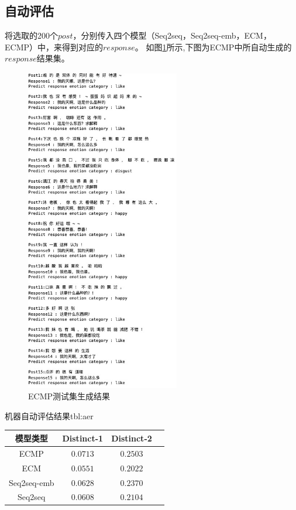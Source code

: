 \documentclass[supercite]{HustGraduPaper}
\theoremstyle{definition}
\begin{document}
\subsection{自动评估}
将选取的200个$post$，分别传入四个模型（Seq2seq，Seq2seq-emb，ECM，ECMP）中，来得到对应的$response$。
如图\ref{Fig.result}所示,下图为ECMP中所自动生成的$response$结果集。
\begin{figure}[H] %
  \centering %
  \includegraphics[width=0.6\textwidth]{images/result.png} %
  \caption{ECMP测试集生成结果} %
  \label{Fig.result} %
\end{figure}

\begin{generaltab}{机器自动评估结果}{tbl:aer}
  \begin{tabular}{c|ccc}
    \toprule
    模型类型 & Distinct-1 & Distinct-2 \\
    \midrule
    ECMP & $0.0713$ & $0.2503$\\
    ECM & $0.0551$ & $0.2022$\\
    Seq2seq-emb & $0.0628$ & $0.2370$\\
    Seq2seq & $0.0608$ & $0.2104$\\
    \bottomrule
  \end{tabular}
\end{generaltab}
\end{document}
